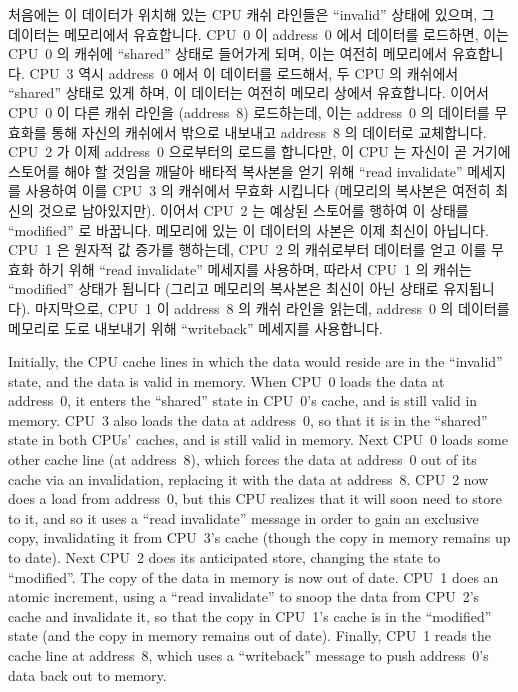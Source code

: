 \fi

처음에는 이 데이터가 위치해 있는 CPU 캐쉬 라인들은 ``invalid'' 상태에 있으며,
그 데이터는 메모리에서 유효합니다.
CPU~0 이 address~0 에서 데이터를 로드하면, 이는 CPU~0 의 캐쉬에 ``shared''
상태로 들어가게 되며, 이는 여전히 메모리에서 유효합니다.
CPU~3  역시 address~0 에서 이 데이터를 로드해서, 두 CPU 의 캐쉬에서 ``shared''
상태로 있게 하며, 이 데이터는 여전히 메모리 상에서 유효합니다.
이어서 CPU~0 이 다른 캐쉬 라인을 (address~8) 로드하는데, 이는 address~0 의
데이터를 무효화를 통해 자신의 캐쉬에서 밖으로 내보내고 address~8 의 데이터로
교체합니다.
CPU~2 가 이제 address~0 으로부터의 로드를 합니다만, 이 CPU 는 자신이 곧 거기에
스토어를 해야 할 것임을 깨달아 배타적 복사본을 얻기 위해 ``read invalidate''
메세지를 사용하여 이를 CPU~3 의 캐쉬에서 무효화 시킵니다 (메모리의 복사본은
여전히 최신의 것으로 남아있지만).
이어서 CPU~2 는 예상된 스토어를 행하여 이 상태를 ``modified'' 로 바꿉니다.
메모리에 있는 이 데이터의 사본은 이제 최신이 아닙니다.
CPU~1 은 원자적 값 증가를 행하는데, CPU~2 의 캐쉬로부터 데이터를 얻고 이를
무효화 하기 위해 ``read invalidate'' 메세지를 사용하며, 따라서 CPU~1 의 캐쉬는
``modified'' 상태가 됩니다 (그리고 메모리의 복사본은 최신이 아닌 상태로
유지됩니다).
마지막으로, CPU~1 이 address~8 의 캐쉬 라인을 읽는데, address~0 의 데이터를
메모리로 도로 내보내기 위해 ``writeback'' 메세지를 사용합니다.

\iffalse

Initially, the CPU cache lines in which the data would reside are
in the ``invalid'' state, and the data is valid in memory.
When CPU~0 loads the data at address~0, it enters the ``shared'' state in
CPU~0's cache, and is still valid in memory.
CPU~3 also loads the data at address~0, so that it is in the
``shared'' state in both CPUs' caches, and is still valid in memory.
Next CPU~0 loads some other cache line (at address~8),
which forces the data at address~0 out of its cache via an invalidation,
replacing it with the data at address~8.
CPU~2 now does a load from address~0, but this CPU realizes that it will
soon need to store to it, and so it uses a ``read invalidate'' message
in order to gain an exclusive copy, invalidating
it from CPU~3's cache (though the copy in memory remains up to date).
Next CPU~2 does its anticipated store, changing the state to ``modified''.
The copy of the data in memory is now out of date.
CPU~1 does an atomic increment, using a ``read invalidate'' to snoop
the data from CPU~2's cache
and invalidate it, so that the copy in CPU~1's cache is in the ``modified''
state (and the copy in memory remains out of date).
Finally, CPU~1 reads the cache line at address~8, which uses a
``writeback'' message to push address~0's data back out to memory.

